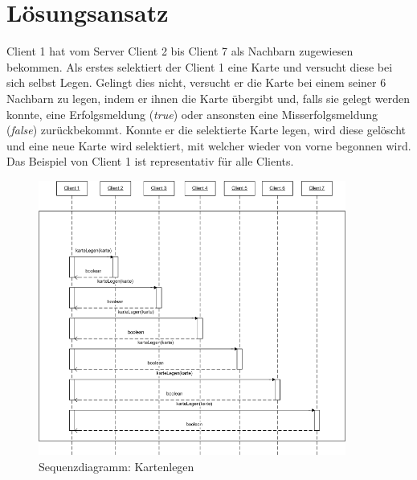 \section{Lösungsansatz} 

Client 1 hat vom Server Client 2 bis Client 7 als Nachbarn zugewiesen bekommen. Als erstes selektiert der Client 1 eine Karte und versucht diese bei sich selbst Legen. Gelingt dies nicht, versucht er die Karte bei einem seiner 6 Nachbarn zu legen, indem er ihnen die Karte übergibt und, falls sie gelegt werden konnte, eine Erfolgsmeldung (\textit{true}) oder ansonsten eine Misserfolgsmeldung (\textit{false}) zurückbekommt. Konnte er die selektierte Karte legen, wird diese gelöscht und eine neue Karte wird selektiert, mit welcher wieder von vorne begonnen wird. Das Beispiel von Client 1 ist representativ für alle Clients. 

\begin{figure}[hbt]
  \centering
  \includegraphics[width=0.90\textwidth,angle=0]{graphics/Kartenlegen_Sequenzdiagramm.png}
  \caption{Sequenzdiagramm: Kartenlegen}
\end{figure}




